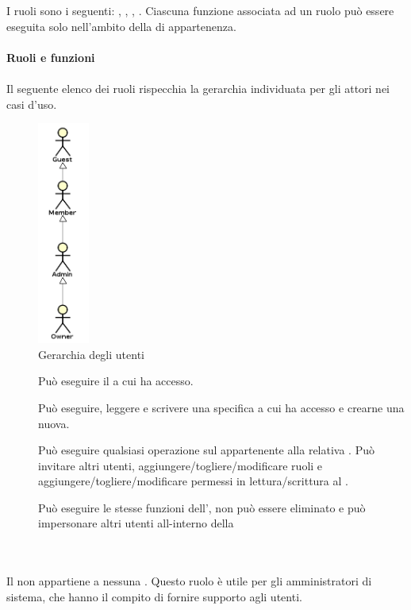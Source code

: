 \begin{description}
	I ruoli sono i seguenti: , , , .	
	Ciascuna funzione associata ad un ruolo pu\`o essere eseguita solo nell'ambito della  di appartenenza. \\\\
	\textbf{Ruoli e funzioni} \hfill \\\\
		Il seguente elenco dei ruoli rispecchia la gerarchia individuata per gli attori nei casi d'uso.
                 \begin{figure}[H]
                   \begin{center}
                     \includegraphics[width=0.15\textwidth]{res/img/UCUtenti/gerarchia_utenti.png}
                     \caption{Gerarchia degli utenti}
                   \end{center} 
                 \end{figure}  
		\begin{description}
			\item[] Pu\`o eseguire il  a cui ha accesso.
			\item[] Pu\`o eseguire, leggere e scrivere una specifica  a cui ha accesso e crearne una nuova.
			\item[] Pu\`o eseguire qualsiasi operazione sul  appartenente alla relativa . Pu\`o invitare altri utenti, aggiungere/togliere/modificare ruoli e aggiungere/togliere/modificare permessi in lettura/scrittura al .
			\item[] Pu\`o eseguire le stesse funzioni dell', non pu\`o essere eliminato e pu\`o impersonare altri utenti all-interno della 
		\end{description}
	\item[\glossaryItem{Super-Admin}] \hfill \\\\
	Il  non appartiene a nessuna . Questo ruolo \`e utile per gli amministratori di sistema, che hanno il compito di fornire supporto agli utenti.
\end{description}

\newpage

